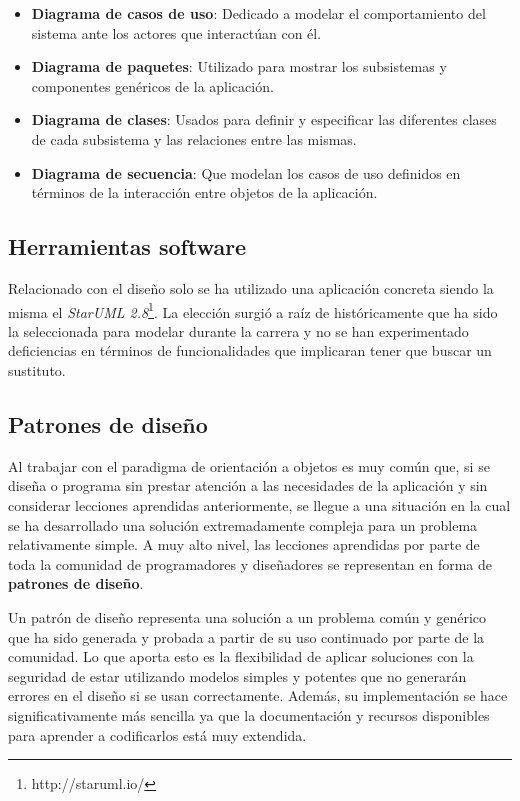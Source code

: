 \begin{itemize}
	\item \textbf{Diagrama de casos de uso}: Dedicado a modelar el comportamiento del sistema ante los actores que interactúan con él.
	\item \textbf{Diagrama de paquetes}: Utilizado para mostrar los subsistemas y componentes genéricos de la aplicación.
	\item \textbf{Diagrama de clases}: Usados para definir y especificar las diferentes clases de cada subsistema y las relaciones entre las mismas.
	\item \textbf{Diagrama de secuencia}: Que modelan los casos de uso definidos en términos de la interacción entre objetos de la aplicación.
\end{itemize}

\subsection{Herramientas software}

Relacionado con el diseño solo se ha utilizado una aplicación concreta siendo la misma el \textit{StarUML 2.8}\footnote{http://staruml.io/}. La elección surgió a raíz de históricamente que ha sido la seleccionada para modelar durante la carrera y no se han experimentado deficiencias en términos de funcionalidades que implicaran tener que buscar un sustituto.

\subsection{Patrones de diseño}

Al trabajar con el paradigma de orientación a objetos es muy común que, si se diseña o programa sin prestar atención a las necesidades de la aplicación y sin considerar lecciones aprendidas anteriormente, se llegue a una situación en la cual se ha desarrollado una solución extremadamente compleja para un problema relativamente simple. A muy alto nivel, las lecciones aprendidas por parte de toda la comunidad de programadores y diseñadores se representan en forma de \textbf{patrones de diseño}.

\bigskip

Un patrón de diseño representa una solución a un problema común y genérico que ha sido generada y probada a partir de su uso continuado por parte de la comunidad. Lo que aporta esto es la flexibilidad de aplicar soluciones con la seguridad de estar utilizando modelos simples y potentes que no generarán errores en el diseño si se usan correctamente. Además, su implementación se hace significativamente más sencilla ya que la documentación y recursos disponibles para aprender a codificarlos está muy extendida.

